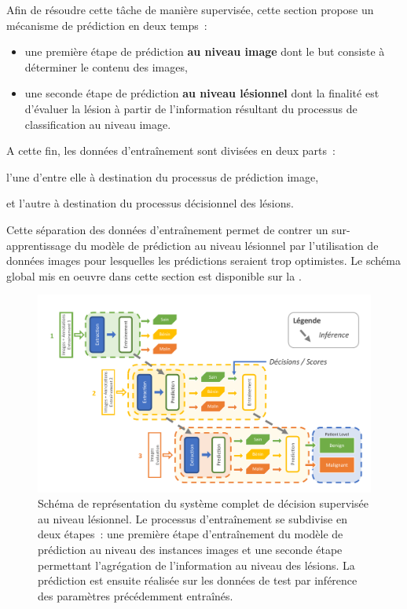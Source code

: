 Afin de résoudre cette tâche de manière supervisée, cette section propose un mécanisme de prédiction en deux temps~: 
\begin{itemize}
    \item une première étape de prédiction \textbf{au niveau image} dont le but consiste à déterminer le contenu des images,
    \item une seconde étape de prédiction \textbf{au niveau lésionnel} dont la finalité est d'évaluer la lésion à partir de l'information résultant du processus de classification au niveau image.
\end{itemize} A cette fin, les données d'entraînement sont divisées en deux parts~:
\begin{inlinerate}
    \item l'une d'entre elle à destination du processus de prédiction image,
    \item et l'autre à destination du processus décisionnel des lésions.
\end{inlinerate}
Cette séparation des données d'entraînement permet de contrer un sur-apprentissage du modèle de prédiction au niveau lésionnel par l'utilisation de données images pour lesquelles les prédictions seraient trop optimistes. Le schéma global mis en oeuvre dans cette section est disponible sur la .\par

\begin{figure}[H]
    \centering
    \includegraphics[width=0.95\linewidth]{contents/chapter_6/resources/scheme_patient_decision.pdf}
    \caption{Schéma de représentation du système complet de décision supervisée au niveau lésionnel. Le processus d'entraînement se subdivise en deux étapes~: une première étape d'entraînement du modèle de prédiction au niveau des instances images et une seconde étape permettant l'agrégation de l'information au niveau des lésions. La prédiction est ensuite réalisée sur les données de test par inférence des paramètres précédemment entraînés.}
    \label{fig:scheme_patient_decision}
\end{figure}\par

